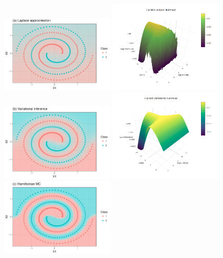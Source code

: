 \begin{figure}[p]
  \centering
  \vspace{1em}
  \includegraphics[width=0.49\textwidth]{figure/05-fit_lap}
  \includegraphics[width=0.49\textwidth]{figure/05-lik_lap}
  \vspace{1em}
  \includegraphics[width=0.49\textwidth]{figure/05-fit_vi}
  \includegraphics[width=0.49\textwidth]{figure/05-lik_vi}
  \vspace{1em}
  \includegraphics[width=0.49\textwidth]{figure/05-fit_hmc}

\end{figure}
